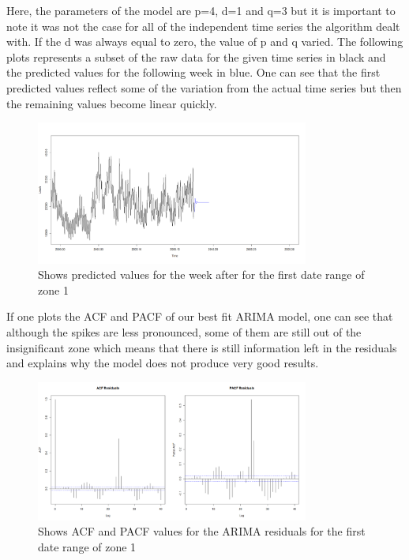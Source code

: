 \documentclass{article} %
\begin{document}
Here, the parameters of the model are p=4, d=1 and q=3 but it is important to note it was not the case for all of the independent time series the algorithm dealt with. If the d was always equal to zero, the value of p and q varied. 
The following plots represents a subset of the raw data for the given time series in black and the predicted values for the following week in blue. One can see that the first predicted values reflect some of the variation from the actual time series but then the remaining values become linear quickly.

\begin{figure}
  \centering
    \includegraphics[width=0.80\textwidth]{LoadsPred}
  \caption{Shows predicted values for the week after for the first date range of zone 1 }
\end{figure}

If one plots the ACF and PACF of our best fit ARIMA model, one can see that although the spikes are less pronounced, some of them are still out of the insignificant zone which means that there is still information left in the residuals and explains why the model does not produce very good results.

\begin{figure}
  \centering
    \includegraphics[width=0.80\textwidth]{ACFandPACFLoadsArimaResults}
  \caption{Shows ACF and PACF values for the ARIMA residuals for the first date range of zone 1 }
\end{figure}
\end{document}
